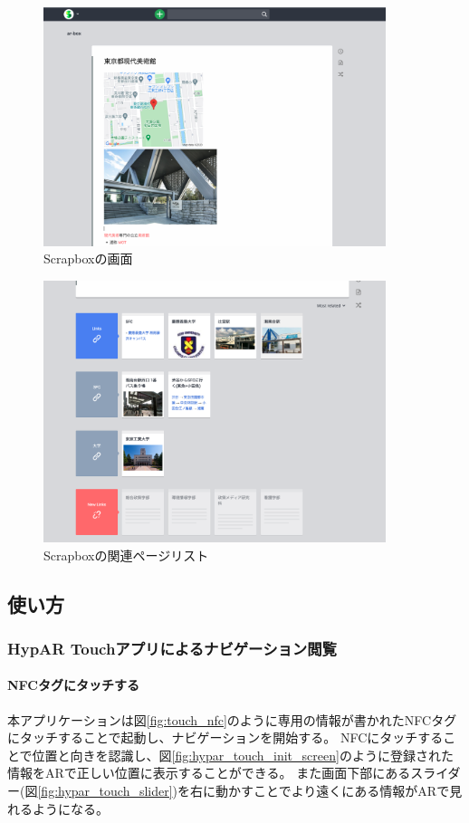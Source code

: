 \begin{figure}[htbp]
  \centering
  \includegraphics[width=100mm]{images/scrapbox_screen.png}
  \caption{Scrapboxの画面} \label{fig:scrapbox}
\end{figure}

\begin{figure}[htbp]
  \centering
  \includegraphics[width=100mm]{images/scrapbox_related_screen.png}
  \caption{Scrapboxの関連ページリスト} \label{fig:scrapbox_related}
\end{figure}

\subsection{使い方}

\subsubsection{HypAR Touchアプリによるナビゲーション閲覧}
\paragraph*{NFCタグにタッチする}
本アプリケーションは図\ref{fig:touch_nfc}のように専用の情報が書かれたNFCタグにタッチすることで起動し、ナビゲーションを開始する。
NFCにタッチすることで位置と向きを認識し、図\ref{fig:hypar_touch_init_screen}のように登録された情報をARで正しい位置に表示することができる。
また画面下部にあるスライダー(図\ref{fig:hypar_touch_slider})を右に動かすことでより遠くにある情報がARで見れるようになる。

